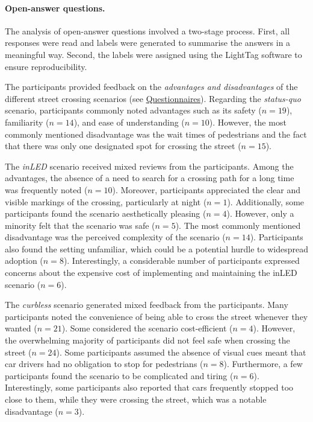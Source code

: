 \paragraph{Open-answer questions.} 
The analysis of open-answer questions involved a two-stage process. First, all responses were read and labels were generated to summarise the answers in a meaningful way. Second, the labels were assigned using the LightTag software to ensure reproducibility.

The participants provided feedback on the \emph{advantages and disadvantages} of the different street crossing scenarios (see \hyperref[apx:quest]{Questionnaires}).
Regarding the \emph{status-quo} scenario, participants commonly noted advantages such as its safety ($n=19$), familiarity ($n=14$), and ease of understanding ($n=10$). However, the most commonly mentioned disadvantage was the wait times of pedestrians and the fact that there was only one designated spot for crossing the street ($n=15$).

The \emph{inLED} scenario received mixed reviews from the participants. Among the advantages, the absence of a need to search for a crossing path for a long time was frequently noted ($n=10$). Moreover, participants appreciated the clear and visible markings of the crossing, particularly at night ($n=1$). Additionally, some participants found the scenario aesthetically pleasing ($n=4$). However, only a minority felt that the scenario was safe ($n=5$).
The most commonly mentioned disadvantage was the perceived complexity of the scenario ($n=14$). Participants also found the setting unfamiliar, which could be a potential hurdle to widespread adoption ($n=8$). Interestingly, a considerable number of participants expressed concerns about the expensive cost of implementing and maintaining the inLED scenario ($n=6$).

The \emph{curbless} scenario generated mixed feedback from the participants. Many participants noted the convenience of being able to cross the street whenever they wanted ($n=21$). Some considered the scenario cost-efficient ($n=4$).
However, the overwhelming majority of participants did not feel safe when crossing the street ($n=24$). Some participants assumed the absence of visual cues meant that car drivers had no obligation to stop for pedestrians ($n=8$). Furthermore, a few participants found the scenario to be complicated and tiring ($n=6$).
Interestingly, some participants also reported that cars frequently stopped too close to them, while they were crossing the street, which was a notable disadvantage ($n=3$).


